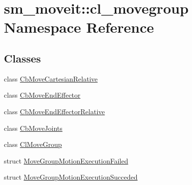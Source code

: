 \hypertarget{namespacesm__moveit_1_1cl__movegroup}{}\section{sm\+\_\+moveit\+:\+:cl\+\_\+movegroup Namespace Reference}
\label{namespacesm__moveit_1_1cl__movegroup}
\subsection*{Classes}
\begin{DoxyCompactItemize}
\item 
class \hyperlink{classsm__moveit_1_1cl__movegroup_1_1CbMoveCartesianRelative}{Cb\+Move\+Cartesian\+Relative}
\item 
class \hyperlink{classsm__moveit_1_1cl__movegroup_1_1CbMoveEndEffector}{Cb\+Move\+End\+Effector}
\item 
class \hyperlink{classsm__moveit_1_1cl__movegroup_1_1CbMoveEndEffectorRelative}{Cb\+Move\+End\+Effector\+Relative}
\item 
class \hyperlink{classsm__moveit_1_1cl__movegroup_1_1CbMoveJoints}{Cb\+Move\+Joints}
\item 
class \hyperlink{classsm__moveit_1_1cl__movegroup_1_1ClMoveGroup}{Cl\+Move\+Group}
\item 
struct \hyperlink{structsm__moveit_1_1cl__movegroup_1_1MoveGroupMotionExecutionFailed}{Move\+Group\+Motion\+Execution\+Failed}
\item 
struct \hyperlink{structsm__moveit_1_1cl__movegroup_1_1MoveGroupMotionExecutionSucceded}{Move\+Group\+Motion\+Execution\+Succeded}
\end{DoxyCompactItemize}
